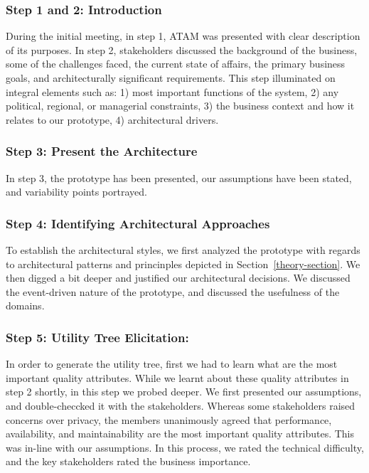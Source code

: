 \documentclass{bmcart}
\begin{document}
\subsubsection{Step 1 and 2: Introduction}

During the initial meeting, in step 1, ATAM was presented with clear description of its purposes. In step 2, stakeholders discussed the background of the business, some of the challenges faced, the current state of affairs, the primary business goals, and architecturally significant requirements. This step illuminated on integral elements such as: 1) most important functions of the system, 2) any political, regional, or managerial constraints, 3) the business context and how it relates to our prototype, 4) architectural drivers.


\subsubsection{Step 3: Present the Architecture}

In step 3, the prototype has been presented, our assumptions have been stated, and variability points portrayed. 

\subsubsection{Step 4: Identifying Architectural Approaches}

To establish the architectural styles, we first analyzed the prototype with regards to architectural patterns and princinples depicted in Section~\ref*{theory-section}. We then digged a bit deeper and justified our architectural decisions. We discussed the event-driven nature of the prototype, and discussed the usefulness of the domains.

\subsubsection{Step 5: Utility Tree Elicitation:}
In order to generate the utility tree, first we had to learn what are the most important quality attributes. While we learnt about these quality attributes in step 2 shortly, in this step we probed deeper. We first presented our assumptions, and double-checcked it with the stakeholders. Whereas some stakeholders raised concerns over privacy, the members unanimously agreed that performance, availability, and maintainability are the most important quality attributes. This was in-line with our assumptions. In this process, we rated the technical difficulty, and the key stakeholders rated the business importance.
\end{document}
